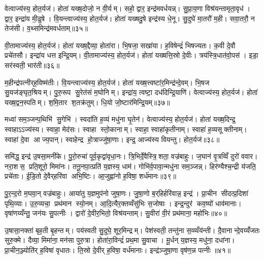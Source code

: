 वेत्वाज्य॑स्य॒ होत॒र्यज॑। होता॑ यख्ष॒दोजो॒ न वी॒र्यम्। सहो॒ द्वार॒ इन्द्र॑मवर्धयन्न्। सु॒प्रा॒य॒णा विश्र॑यन्तामृता॒वृध॑। द्वार॒ इन्द्रा॑य मी॒ढुषे। वि॒यन्त्वाज्य॑स्य॒ होत॒र्यज॑। होता॑ यख्षदु॒षे इन्द्र॑स्य धे॒नू। सु॒दुघे॑ मा॒तरौ॑ म॒ही। सवा॒तरौ॒ न तेज॑सी। व॒थ्समिन्द्र॑मवर्धताम्॥३५॥

वी॒तामाज्य॑स्य॒ होत॒र्यज॑। होता॑ यख्ष॒द्दैव्या॒ होता॑रा। भि॒षजा॒ सखा॑या। ह॒विषेन्द्रं॑ भिषज्यतः। क॒वी दे॒वौ प्रचे॑तसौ। इन्द्रा॑य धत्त इन्द्रि॒यम्। वी॒तामाज्य॑स्य॒ होत॒र्यज॑। होता॑ यख्षत्ति॒स्रो दे॒वीः। त्रय॑स्त्रि॒धात॑वो॒पस॑। इडा॒ सर॑स्वती॒ भार॑ती॥३६॥

म॒हीन्द्र॑पत्नीर्‌ह॒विष्म॑तीः। वि॒यन्त्वाज्य॑स्य॒ होत॒र्यज॑। होता॑ यख्ष॒त्त्वष्टा॑र॒मिन्द्र॑न्दे॒वम्। भि॒षज सु॒यज॑ङ्घृत॒श्रियम्। पु॒रु॒रूप सु॒रेत॑सं म॒घोनिम्। इन्द्रा॑य॒ त्वष्टा॒ दध॑दिन्द्रि॒याणि॑। वेत्वाज्य॑स्य॒ होत॒र्यज॑। होता॑ यख्ष॒द्वन॒स्पतिम्। श॒मि॒तार श॒तक्र॑तुम्। धि॒यो जो॒ष्टार॑मिन्द्रि॒यम्॥३७॥

मध्वा॑ सम॒ञ्जन्प॒थिभि॑ सु॒गेभि॑। स्वदा॑ति ह॒व्यं मधु॑ना घृ॒तेन॑। वेत्वाज्य॑स्य॒ होत॒र्यज॑। होता॑ यख्ष॒दिन्द्र॒ स्वाहाऽऽज्य॑स्य। स्वाहा॒ मेद॑सः। स्वाहा स्तो॒कानाम्। स्वाहा॒ स्वाहा॑कृतीनाम्। स्वाहा॑ ह॒व्यसूक्तीनाम्। स्वाहा॑ दे॒वा आज्य॒पान्। स्वाहेन्द्र हो॒त्राज्जु॑षा॒णाः। इन्द्र॒ आज्य॑स्य वियन्तु। होत॒र्यज॑॥३८॥\anuvakamend[तेज॑साऽऽसददवर्धतां॒ भार॑तीन्द्रि॒यञ्जु॑षा॒णा द्वे च॑ (स॒मिधेन्द्र॒न्तनू॒नपा॑त॒मिडा॑भिर्ब॒र्॒हिष्योज॑ उ॒षे दैव्या॑ ति॒स्रस्त्वष्टा॑रं॒ वन॒स्पति॒मिन्द्रम् ॥ स॒मिधेन्द्र॑ञ्च॒तुर्वेत्वेको॑ वि॒यन्तु॒ द्विर्वी॒तामेको॑ वि॒यन्तु॒ द्विर्वेत्वेको॑ वि॒यन्तु॒ होत॒र्यज॑ ॥ )]

समि॑द्ध॒ इन्द्र॑ उ॒षसा॒मनी॑के। पु॒रो॒रुचा॑ पूर्व॒कृद्वा॑वृधा॒नः। त्रि॒भिर्दे॒वैस्त्रि॒शता॒ वज्र॑बाहुः। ज॒घान॑ वृ॒त्रव्विँ दुरो॑ ववार। नरा॒शस॒ प्रति॒शूरो॒ मिमा॑नः। तनू॒नपा॒त्प्रति॑ य॒ज्ञस्य॒ धाम॑। गोभि॑र्व॒पावा॒न्मधु॑ना सम॒ञ्जन्न्। हिर॑ण्यैश्च॒न्द्री य॑जति॒ प्रचे॑ताः। ई॒डि॒तो दे॒वैर्‌हरि॑वा अभि॒ष्टिः। आ॒जुह्वा॑नो ह॒विषा॒ शर्ध॑मानः॥३९॥

पु॒र॒न्द॒रो म॒घवा॒न् वज्र॑बाहुः। आया॑तु य॒ज्ञमुप॑नो जुषा॒णः। जु॒षा॒णो ब॒र्‌हिर्हरि॑वान्न॒ इन्द्र॑। प्रा॒चीन सीदत्प्र॒दिशा॑ पृथि॒व्याः। उ॒रु॒व्यचा॒ प्रथ॑मान स्यो॒नम्। आ॒दि॒त्यैर॒क्तव्वँसु॑भिः स॒जोषाः। इन्द्र॒न्दुर॑ कव॒ष्यो॑ धाव॑मानाः। वृषा॑णय्यँन्तु॒ जन॑यः सु॒पत्नीः। द्वारो॑ दे॒वीर॒भितो॒ विश्र॑यन्ताम्। सु॒वीरा॑ वी॒रं प्रथ॑माना॒ महो॑भिः॥४०॥

उ॒षासा॒नक्ता॑ बृह॒ती बृ॒हन्तम्। पय॑स्वती सु॒दुघे॒ शूर॒मिन्द्रम्। पेश॑स्वती॒ तन्तु॑ना स॒व्व्यँय॑न्ती। दै॒वानान्दे॒वय्यँ॑जतः सुरु॒क्मे। दैव्या॒ मिमा॑ना॒ मन॑सा पुरु॒त्रा। होता॑रा॒विन्द्रं॑ प्रथ॒मा सु॒वाचा। मू॒र्धन् य॒ज्ञस्य॒ मधु॑ना॒ दधा॑ना। प्रा॒चीन॒ञ्ज्योति॑र् ह॒विषा॑ वृधातः। ति॒स्रो दे॒वीर्‌ ह॒विषा॒ वर्ध॑मानाः। इन्द्र॑ञ्जुषा॒णा वृष॑ण॒न्न पत्नीः॥४१॥

